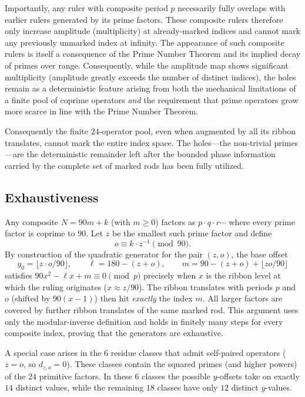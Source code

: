 \documentclass[11pt,a4paper]{article}
\begin{document}
{Importantly, any ruler with composite period \(p\) necessarily fully overlaps with earlier rulers generated by its prime factors. These composite rulers therefore only increase amplitude (multiplicity) at already-marked indices and cannot mark any previously unmarked index at infinity. The appearance of such composite rulers is itself a consequence of the Prime Number Theorem and its implied decay of primes over range. Consequently, while the amplitude map shows significant multiplicity (amplitude greatly exceeds the number of distinct indices), the holes remain as a deterministic feature arising from both the mechanical limitations of a finite pool of coprime operators \emph{and} the requirement that prime operators grow more scarce in line with the Prime Number Theorem.

Consequently the finite $24$-operator pool, even when augmented by all its ribbon translates, cannot mark the entire index space. The holes---the non-trivial primes---are the deterministic remainder left after the bounded phase information carried by the complete set of marked rods has been fully utilized.
\subsection{Exhaustiveness}

Any composite \(N=90m+k\) (with \(m\geq0\)) factors as \(p\cdot q\cdot r\cdots\) where every prime factor is coprime to \(90\). Let \(z\) be the smallest such prime factor and define
\[
o\equiv k\cdot z^{-1}\pmod{90}.
\]
By construction of the quadratic generator for the pair \((z,o)\), the base offset
\[
y_0=\lfloor z\cdot o/90\rfloor,\qquad \ell=180-(z+o),\qquad m=90-(z+o)+\lfloor zo/90\rfloor
\]
satisfies \(90x^2-\ell x+m\equiv0\pmod{p}\) precisely when \(x\) is the ribbon level at which the ruling originates (\(x\approx z/90\)). The ribbon translates with periods \(p\) and \(o\) (shifted by \(90(x-1)\)) then hit \emph{exactly} the index \(m\). All larger factors are covered by further ribbon translates of the same marked rod. This argument uses only the modular-inverse definition and holds in finitely many steps for every composite index, proving that the generators are exhaustive.

A special case arises in the \(6\) residue classes that admit self-paired operators (\(z=o\), so \(d_{z,o}=0\)). These classes contain the squared primes (and higher powers) of the \(24\) primitive factors. In these \(6\) classes the possible \(y\)-offsets take on exactly \(14\) distinct values, while the remaining \(18\) classes have only \(12\) distinct \(y\)-values.

}
\end{document}
